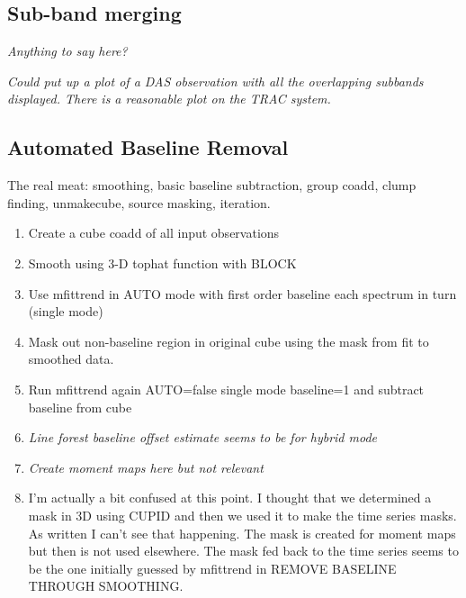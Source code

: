 \documentclass[final,authoryear,5p,times,twocolumn]{elsarticle}
\begin{document}
\subsection{Sub-band merging}

\textit{Anything to say here?}

\textit{Could put up a plot of a DAS observation with all the
  overlapping subbands displayed. There is a reasonable plot on the
  TRAC system.}

\subsection{Automated Baseline Removal}

The real meat: smoothing, basic baseline subtraction, group coadd,
clump finding, unmakecube, source masking, iteration.

\begin{enumerate}
\item Create a cube coadd of all input observations
\item Smooth using 3-D tophat function with BLOCK
\item Use mfittrend in AUTO mode with first order baseline each
  spectrum in turn (single mode)
\item Mask out non-baseline region in original cube using the mask
  from fit to smoothed data.
\item Run mfittrend again AUTO=false single mode baseline=1 and
  subtract baseline from cube
\item \textit{Line forest baseline offset estimate seems to be for
    hybrid mode}
\item \textit{Create moment maps here but not relevant}
\item I'm actually a bit confused at this point. I thought that we
  determined a mask in 3D using CUPID and then we used it to make the
  time series masks. As written I can't see that happening. The mask
  is created for moment maps but then is not used elsewhere. The mask
  fed back to the time series seems to be the one initially guessed by
  mfittrend in REMOVE BASELINE THROUGH SMOOTHING.



\end{enumerate}
\end{document}
